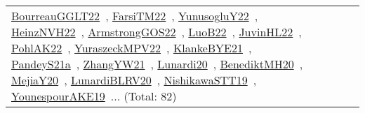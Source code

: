 {\begin{longtable}{lp{3cm}>{\raggedright\arraybackslash}p{6cm}>{\raggedright\arraybackslash}p{6cm}>{\raggedright\arraybackslash}p{8cm}}
\href{works/BourreauGGLT22.pdf}{BourreauGGLT22}~\cite{BourreauGGLT22}, \href{works/FarsiTM22.pdf}{FarsiTM22}~\cite{FarsiTM22}, \href{works/YunusogluY22.pdf}{YunusogluY22}~\cite{YunusogluY22}, \href{works/HeinzNVH22.pdf}{HeinzNVH22}~\cite{HeinzNVH22}, \href{works/ArmstrongGOS22.pdf}{ArmstrongGOS22}~\cite{ArmstrongGOS22}, \href{works/LuoB22.pdf}{LuoB22}~\cite{LuoB22}, \href{works/JuvinHL22.pdf}{JuvinHL22}~\cite{JuvinHL22}, \href{works/PohlAK22.pdf}{PohlAK22}~\cite{PohlAK22}, \href{works/YuraszeckMPV22.pdf}{YuraszeckMPV22}~\cite{YuraszeckMPV22}, \href{works/KlankeBYE21.pdf}{KlankeBYE21}~\cite{KlankeBYE21}, \href{works/PandeyS21a.pdf}{PandeyS21a}~\cite{PandeyS21a}, \href{works/ZhangYW21.pdf}{ZhangYW21}~\cite{ZhangYW21}, \href{works/Lunardi20.pdf}{Lunardi20}~\cite{Lunardi20}, \href{works/BenediktMH20.pdf}{BenediktMH20}~\cite{BenediktMH20}, \href{works/MejiaY20.pdf}{MejiaY20}~\cite{MejiaY20}, \href{works/LunardiBLRV20.pdf}{LunardiBLRV20}~\cite{LunardiBLRV20}, \href{works/NishikawaSTT19.pdf}{NishikawaSTT19}~\cite{NishikawaSTT19}, \href{works/YounespourAKE19.pdf}{YounespourAKE19}~\cite{YounespourAKE19}... (Total: 82)\\

\end{longtable}}
